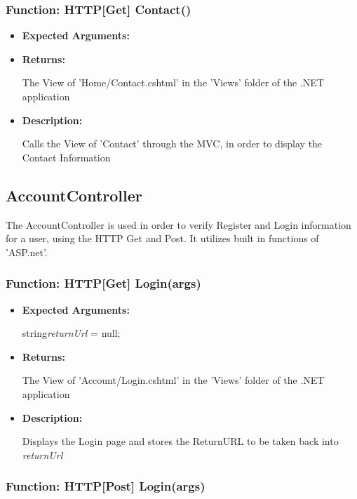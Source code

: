 \documentclass{scrreprt}
\begin{document}
\subsubsection{Function: HTTP[Get] Contact()}

\begin{itemize}
        \item \textbf{Expected Arguments:}
        \item \textbf{Returns:}

                The View of 'Home/Contact.cshtml' in the 'Views' folder of the
                .NET application

        \item \textbf{Description:}

                Calls the View of 'Contact' through the MVC, in order to
                display the Contact Information
\end{itemize}


\subsection{AccountController}

The AccountController is used in order to verify Register and Login information
for a user, using the HTTP Get and Post. It utilizes built in functions of
'ASP.net'.

\subsubsection{Function: HTTP[Get] Login(args)}

\begin{itemize}
        \item \textbf{Expected Arguments:}

                string\quad\textit{returnUrl} = null;

        \item \textbf{Returns:}

                The View of 'Account/Login.cshtml' in the 'Views' folder of the
                .NET application

        \item \textbf{Description:}

                Displays the Login page and stores the ReturnURL to be taken
                back into \textit{returnUrl}
\end{itemize}

\subsubsection{Function: HTTP[Post] Login(args)}
\end{document}
